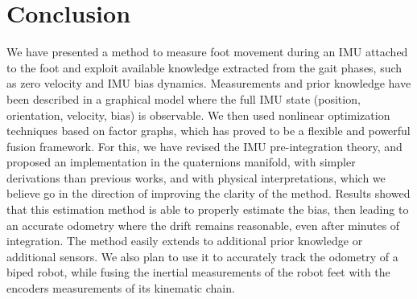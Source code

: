 
\section{Conclusion}

We have presented a method to measure foot movement during an IMU attached to the foot and exploit available knowledge extracted from the gait phases, such as zero velocity and IMU bias dynamics. 
Measurements and prior knowledge have been described in a graphical model where the full IMU state (position, orientation, velocity, bias) is observable. 
We then used nonlinear optimization techniques based on factor graphs, which has proved to be a flexible and powerful fusion framework. For this, we have revised the IMU pre-integration theory, and proposed an implementation in the quaternions manifold, with simpler derivations than previous works, and with physical interpretations, which we believe go in the direction of improving the clarity of the method.
Results showed that this estimation method is able to properly estimate the bias, then leading to an accurate odometry where the drift remains reasonable, even after minutes of integration. 
The method easily extends to additional prior knowledge or additional sensors. 
We also plan to use it to accurately track the odometry of a biped robot, while fusing the inertial measurements of the robot feet with the encoders measurements of its kinematic chain.
